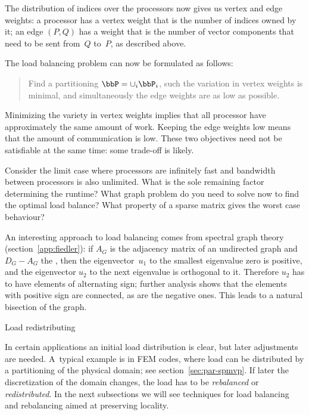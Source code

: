 The distribution of indices over the processors now gives us vertex
and edge weights: a processor has a vertex weight that is the number
of indices owned by it; an edge $(P,Q)$ has a weight that is the number of
vector components that need to be sent from~$Q$ to~$P$, as described above.

The load balancing problem can now be formulated as
follows:
\begin{quote}
  Find a partitioning $\bbP=\cup_i \bbP_i$, such the variation in
  vertex weights is minimal, and simultaneously the edge weights are
  as low as possible.
\end{quote}
Minimizing the variety in vertex weights implies that all processor
have approximately the same amount of work. Keeping the edge weights
low means that the amount of communication is low. These two
objectives need not be satisfiable at the same time: some trade-off is
likely. 

\begin{exercise}
  Consider the limit case where processors are infinitely fast and
  bandwidth between processors is also unlimited. What is the sole
  remaining factor determining the runtime? What graph problem do you
  need to solve now to find the optimal load balance? What property of
  a sparse matrix gives the worst case behaviour?
\end{exercise}

An interesting approach to load balancing comes from spectral graph
theory (section~\ref{app:fiedler}): if $A_G$ is the adjacency matrix
of an undirected graph and $D_G-A_G$ the ,
then the eigenvector~$u_1$ to the smallest eigenvalue zero is
positive, and the eigenvector $u_2$ to the next eigenvalue is
orthogonal to it. Therefore $u_2$ has to have elements of alternating
sign; further analysis shows that the elements with positive sign are
connected, as are the negative ones. This leads to a natural bisection
of the graph.

 {Load redistributing}

In certain applications an initial load distribution is clear, but
later adjustments are needed. A~typical example is in \ac{FEM} codes,
where load can be distributed by a partitioning of the physical
domain; see section~\ref{sec:par-spmvp}. If later the discretization
of the domain changes, the load has to be
\emph{rebalanced} or
\emph{redistributed}. In the next
subsections we will see techniques for load balancing and
rebalancing aimed at preserving locality.

